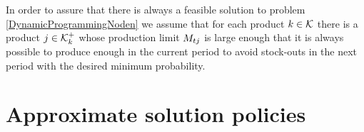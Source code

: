 \documentclass[msom]{oo}
\begin{document}
In order to assure that there is always a feasible solution to problem \eqref{DynamicProgrammingNoden} we assume that for each product $k \in \mathcal{K}$ there is a product $j \in \mathcal{K}^+_k$ whose production limit $M_{t j}$ is large enough that it is always possible to produce enough in the current period to avoid stock-outs in the next period with the desired minimum probability.

\begin{comment}
{\cred Note: I just keep this red part in case we need to have mathematical proof

In this model, it is not explicit that the recourse stage should be feasible. It is using the convention that if it is infeasible, the value function return infinite cost.}


{\cred * Given stage t and the history, $\xi^t, \exists x^t(\xi^t) \in \chi^t(x^t) \rightarrow v(\xi^t)$\\
$s.t.$ \\
$P_{\xi^{t+1}|\xi^t}\{v^{t}(\xi^t)-\sum_{\jey \in  \Csub}\Es_{kj}(\xi^{t+1})+\sum_{\jey \in  \Psub}\Es_{jk}(\xi^{t+1}) \geq D^{t+1}(\xi^{t+1}) $ for some $\Es_{kj}(\xi^{t+1}) , \Es_{jk}(\xi^{t+1}) \in  \chi ^{t+1}(\xi^{t+1}) \} \geq \alpha$ \\
This can be satisfied for instance if we have at least one uncapacitated product option (whether by its own production or substitution) for each product.

}
\end{comment}


\section{Approximate solution policies}
\label{sec:approx}
\end{document}
